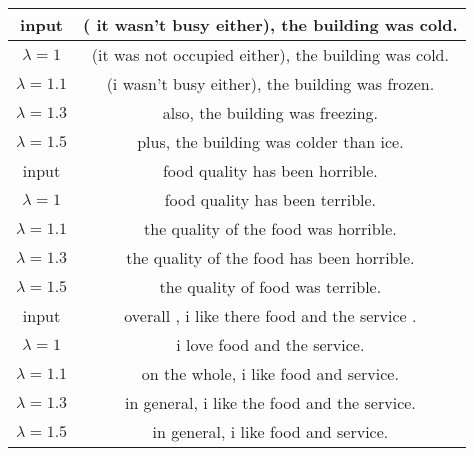 \iffalse
  \begin{table}[ht]
\centering
\begin{tabular}[t]{c|c}
\hline

\hline
\small input	&\small ( it wasn't busy either), the building was cold.  	\\\hline
\small $\lambda = 1$&	\small (it was not occupied either), the building was cold. 		\\
\small $\lambda = 1.1$	&\small (i wasn't busy either), the building was frozen. 	\\
\small $\lambda = 1.3$	&\small also, the building was freezing.  	\\
\small $\lambda = 1.5$	&\small plus, the building was colder than ice. \\\hline
\small input &\small food quality has been horrible.
\\\hline
\small $\lambda = 1$&\small 		food quality has been terrible.  	\\
\small $\lambda = 1.1$	&\small the quality of the food was horrible.  	\\
\small $\lambda = 1.3$& \small 	the quality of the food has been horrible. 	\\
\small $\lambda = 1.5$	& \small the quality of food was terrible.  \\
\hline
\small input	&\small  overall , i like there food and the service .	\\\hline
\small $\lambda = 1$&	\small 	i love food and the service. 	\\
\small $\lambda = 1.1$	&\small on the whole, i like food and service. 	 	\\
\small $\lambda = 1.3$&\small 	in general, i like the food and the service.  \\
\small $\lambda = 1.5$&\small 	in general, i like food and service. 	 \\
\hline


\end{tabular}
\end{table}

